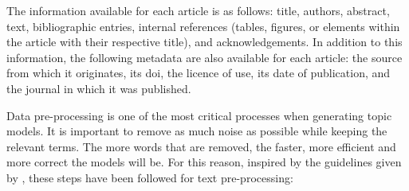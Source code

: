 \documentclass[a4paper,10pt]{article}
\begin{document}
The information available for each article is as follows: title, authors, abstract, text, bibliographic entries, internal references (tables, figures, or elements within the article with their respective title), and acknowledgements. In addition to this information, the following metadata are also available for each article: the source from which it originates, its doi, the licence of use, its date of publication, and the journal in which it was published.

Data pre-processing is one of the most critical processes when generating topic models. It is important to remove as much noise as possible while keeping the relevant terms. The more words that are removed, the faster, more efficient and more correct the models will be. For this reason, inspired by the guidelines given by \cite{LDAMethodology}, these steps have been followed for text pre-processing:
\end{document}
